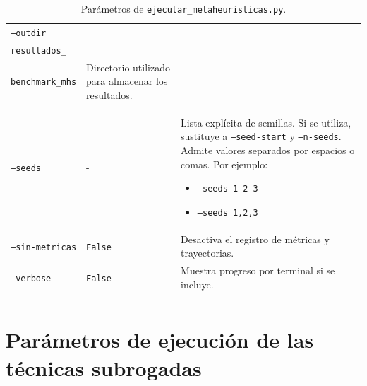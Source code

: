 \begin{longtable}[htbp]{|p{3.3cm}|p{2.8cm}|p{5.15cm}|}
    \texttt{--outdir}
                       & \makecell[l]{\texttt{results/}                                                            \\\texttt{resultados\_}\\\texttt{benchmark\_mhs}}
                       & Directorio utilizado para almacenar los resultados.                                       \\
    \hline

    \texttt{--seeds}
                       & -
                       & Lista explícita de semillas. Si se utiliza, sustituye a
    \texttt{--seed-start} y \texttt{--n-seeds}. Admite valores separados
    por espacios o comas. Por ejemplo:
    \begin{itemize}
        \setlength{\itemsep}{0pt}
        \setlength{\topsep}{2pt}
        \item \texttt{--seeds 1 2 3}
        \item \texttt{--seeds 1,2,3}
    \end{itemize}                                                                                    \\
    \hline

    \texttt{--sin-metricas}
                       & \texttt{False}
                       & Desactiva el registro de métricas y trayectorias.                                         \\
    \hline

    \texttt{--verbose}
                       & \texttt{False}
                       & Muestra progreso por terminal si se incluye.                                              \\
    \hline
    \caption{Parámetros de \texttt{ejecutar\_metaheuristicas.py}.}
    \label{tab:parametros_mhs_benchmark}
\end{longtable}
\endgroup

\section{Parámetros de ejecución de las técnicas subrogadas}

\clearpage
\begingroup
\setlength{\tabcolsep}{5pt}
\renewcommand{\arraystretch}{1.3}

